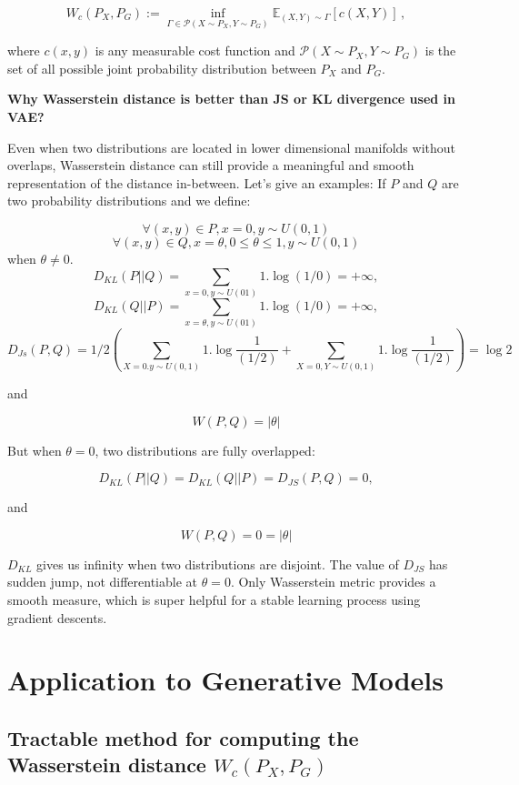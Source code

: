 \documentclass[12pt,english]{amsart}
\begin{document}
\begin{equation}
\label{eq:ot}
W_c(P_X,P_G):=\inf_{\Gamma\in \mathcal{P}(X\sim P_X,Y\sim P_G)} \mathbb{E}_{(X,Y)\sim\Gamma}[c(X,Y)]\,,
\end{equation}

where $c(x,y)$ is any measurable cost function and
$\mathcal{P}(X\sim P_X,Y\sim P_G)$ is the set of all possible joint probability
distribution between $P_X$ and $P_G$.

\textbf{Why Wasserstein distance is better than JS or KL divergence used in VAE?}

Even when two distributions are located in lower dimensional manifolds without
overlaps, Wasserstein distance can still provide a meaningful and smooth
representation of the distance in-between. Let's give an examples: If $P$ and
$Q$ are two probability distributions and we define:

$$\forall (x,y) \in P, x=0 , y\sim U(0,1)$$
$$\forall (x,y) \in Q, x=\theta, 0\leq \theta \leq 1, y\sim U(0,1)$$
when $\theta \not=0$.\\
$$D_{KL}(P||Q)= \sum _{x=0, y \sim U(01)} 1. \log(1/0)= +\infty,$$
$$D_{KL}(Q||P)= \sum _{x=\theta, y \sim U(01)} 1. \log(1/0)= +\infty,$$
$$D_{Js} (P,Q)= 1/2 \left( \sum_{X=0. y \sim U(0,1)}1. \log \frac{1}{(1/2)}+ \sum_{X=0, Y\sim U(0,1)}1. \log \frac{1}{(1/2)}\right)= \log 2$$

and

$$W(P,Q)= |\theta|$$

But when $\theta=0$, two distributions are fully overlapped:

$$D_{KL}(P||Q)= D_{KL}(Q||P)= D_{JS}(P,Q)=0,$$

and

$$W(P,Q)=0=|\theta|$$

$D_{KL}$ gives us infinity when two distributions are disjoint. The value of
$D_{JS}$ has sudden jump, not differentiable at $\theta=0$. Only Wasserstein
metric provides a smooth measure, which is super helpful for a stable learning
process using gradient descents.

\section{Application to Generative Models}

\subsection{Tractable method for computing the Wasserstein distance $W_c(P_X, P_G)$}
\end{document}
